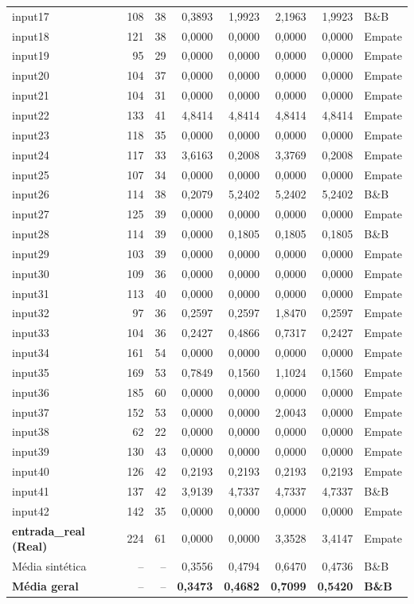 \begin{longtable}{@{}lrrrrrrl@{}}
input17 & 108 & 38 & 0,3893 & 1,9923 & 2,1963 & 1,9923 & B\&B \\
input18 & 121 & 38 & 0,0000 & 0,0000 & 0,0000 & 0,0000 & Empate \\
input19 & 95 & 29 & 0,0000 & 0,0000 & 0,0000 & 0,0000 & Empate \\
input20 & 104 & 37 & 0,0000 & 0,0000 & 0,0000 & 0,0000 & Empate \\
input21 & 104 & 31 & 0,0000 & 0,0000 & 0,0000 & 0,0000 & Empate \\
input22 & 133 & 41 & 4,8414 & 4,8414 & 4,8414 & 4,8414 & Empate \\
input23 & 118 & 35 & 0,0000 & 0,0000 & 0,0000 & 0,0000 & Empate \\
input24 & 117 & 33 & 3,6163 & 0,2008 & 3,3769 & 0,2008 & Empate \\
input25 & 107 & 34 & 0,0000 & 0,0000 & 0,0000 & 0,0000 & Empate \\
input26 & 114 & 38 & 0,2079 & 5,2402 & 5,2402 & 5,2402 & B\&B \\
input27 & 125 & 39 & 0,0000 & 0,0000 & 0,0000 & 0,0000 & Empate \\
input28 & 114 & 39 & 0,0000 & 0,1805 & 0,1805 & 0,1805 & B\&B \\
input29 & 103 & 39 & 0,0000 & 0,0000 & 0,0000 & 0,0000 & Empate \\
input30 & 109 & 36 & 0,0000 & 0,0000 & 0,0000 & 0,0000 & Empate \\
input31 & 113 & 40 & 0,0000 & 0,0000 & 0,0000 & 0,0000 & Empate \\
input32 & 97 & 36 & 0,2597 & 0,2597 & 1,8470 & 0,2597 & Empate \\
input33 & 104 & 36 & 0,2427 & 0,4866 & 0,7317 & 0,2427 & Empate \\
input34 & 161 & 54 & 0,0000 & 0,0000 & 0,0000 & 0,0000 & Empate \\
input35 & 169 & 53 & 0,7849 & 0,1560 & 1,1024 & 0,1560 & Empate \\
input36 & 185 & 60 & 0,0000 & 0,0000 & 0,0000 & 0,0000 & Empate \\
input37 & 152 & 53 & 0,0000 & 0,0000 & 2,0043 & 0,0000 & Empate \\
input38 & 62 & 22 & 0,0000 & 0,0000 & 0,0000 & 0,0000 & Empate \\
input39 & 130 & 43 & 0,0000 & 0,0000 & 0,0000 & 0,0000 & Empate \\
input40 & 126 & 42 & 0,2193 & 0,2193 & 0,2193 & 0,2193 & Empate \\
input41 & 137 & 42 & 3,9139 & 4,7337 & 4,7337 & 4,7337 & B\&B \\
input42 & 142 & 35 & 0,0000 & 0,0000 & 0,0000 & 0,0000 & Empate \\
\rowcolor{realrow} \textbf{entrada\_real (Real)} & 224 & 61 & 0,0000 & 0,0000 & 3,3528 & 3,4147 & Empate \\
\midrule
Média sintética & -- & -- & 0,3556 & 0,4794 & 0,6470 & 0,4736 & B\&B \\
\textbf{Média geral} & -- & -- & \textbf{0,3473} & \textbf{0,4682} & \textbf{0,7099} & \textbf{0,5420} & \textbf{B\&B} \\
\end{longtable}
\endgroup
